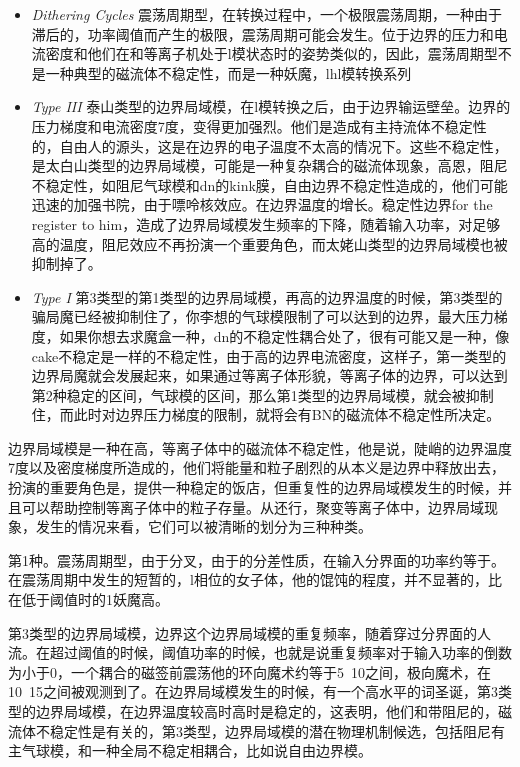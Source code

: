 \begin{itemize}
    \item \textit{Dithering Cycles} 
    震荡周期型，在\Hmode 转换过程中，一个极限震荡周期，一种由于滞后的\Hmode ，功率阈值而产生的极限，震荡周期可能会发生。位于边界的压力和电流密度和他们在和等离子机处于l模状态时的姿势类似的，因此，震荡周期型不是一种典型的磁流体不稳定性，而是一种妖魔，lhl模转换系列
    \item \textit{Type III} 泰山类型的边界局域模，在l模转换之后，由于边界输运壁垒。边界的压力梯度和电流密度7度，变得更加强烈。他们是造成有主持流体不稳定性的，自由人的源头，这是在边界的电子温度不太高的情况下。这些不稳定性，是太白山类型的边界局域模，可能是一种复杂耦合的磁流体现象，高恩，阻尼不稳定性，如阻尼气球模和dn的kink膜，自由边界不稳定性造成的，他们可能迅速的加强书院，由于嘌呤核效应。在边界温度的增长。稳定性边界for the register to him，造成了边界局域模发生频率的下降，随着输入功率，对足够高的温度，阻尼效应不再扮演一个重要角色，而太姥山类型的边界局域模也被抑制掉了。
    \item \textit{Type I} 第3类型的第1类型的边界局域模，再高的边界温度的时候，第3类型的骗局魔已经被抑制住了，你李想的气球模限制了可以达到的边界，最大压力梯度，如果你想去求魔盒一种，dn的不稳定性耦合处了，很有可能又是一种，像cake不稳定是一样的不稳定性，由于高的边界电流密度，这样子，第一类型的边界局魔就会发展起来，如果通过等离子体形貌，等离子体的边界，可以达到第2种稳定的区间，气球模的区间，那么第1类型的边界局域模，就会被抑制住，而此时对边界压力梯度的限制，就将会有BN的磁流体不稳定性所决定。
\end{itemize}






边界局域模是一种在高\Hmode ，等离子体中的磁流体不稳定性，他是说，陡峭的边界温度7度以及密度梯度所造成的，他们将能量和粒子剧烈的从本义是边界中释放出去，扮演的重要角色是，提供一种稳定的\Hmode 饭店，但重复性的边界局域模发生的时候，并且可以帮助控制等离子体中的粒子存量。从还行，聚变等离子体中，边界局域现象，发生的情况来看，它们可以被清晰的划分为三种种类。

第1种。震荡周期型，由于分叉，由于\Hmode 的分差性质，在输入分界面的功率约等于。在震荡周期中发生的短暂的，l相位的女子体，他的馄饨的程度，并不显著的，比在低于阈值时的1妖魔高。

第3类型的边界局域模，边界这个边界局域模的重复频率，随着穿过分界面的人流。在超过阈值的时候，阈值功率的时候，也就是说重复频率对于输入功率的倒数为小于0，一个耦合的磁签前震荡他的环向魔术约等于5~10之间，极向魔术，在10~15之间被观测到了。在边界局域模发生的时候，有一个高水平的词圣诞，第3类型的边界局域模，在边界温度较高时高时是稳定的，这表明，他们和带阻尼的，磁流体不稳定性是有关的，第3类型，边界局域模的潜在物理机制候选，包括阻尼有主气球模，和一种全局不稳定相耦合，比如说自由边界模。


